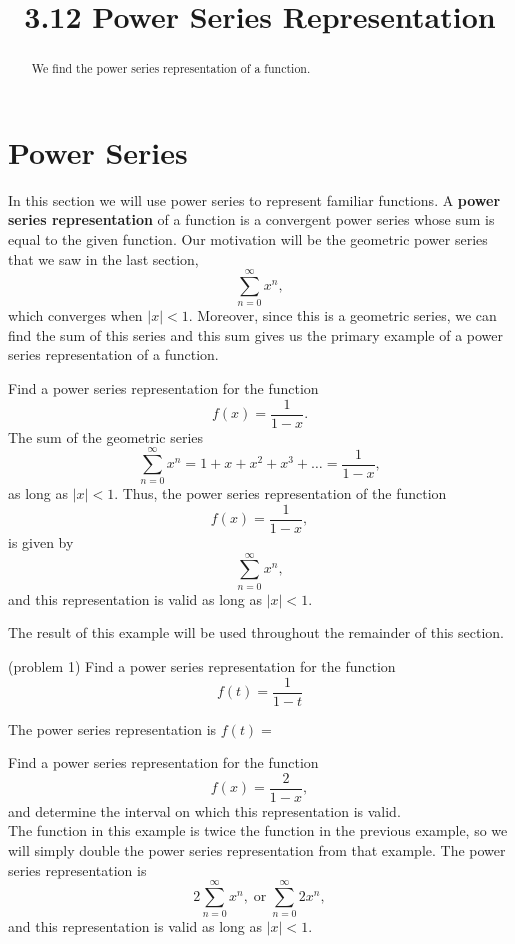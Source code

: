 \documentclass[handout]{ximera}
\title{3.12 Power Series Representation}
\begin{document}
\begin{abstract}
We find the power series representation of a function.
\end{abstract}

\maketitle

\section{Power Series}

In this section we will use power series to represent familiar functions.
A \textbf{power series representation} of a function is a convergent power series whose sum is equal to the given function.
Our motivation will be the geometric power series that we saw in the last section,
\[
\sum_{n=0}^\infty x^n,
\]
which converges when $|x| < 1$. Moreover, since this is a geometric series, we can find the sum of this series
and this sum gives us the primary example of a power series representation of a function.

\begin{example}[example 1]
Find a power series representation for the function 
\[
f(x) = \frac{1}{1-x}.
\]
The sum of the geometric series
\[
\sum_{n=0}^\infty x^n = 1 + x + x^2 + x^3 + \dots =  \frac{1}{1-x},
\]
as long as $|x| < 1$.  Thus, the power series representation of the function 
\[
f(x) = \frac{1}{1-x},
\]
is given by 
\[
\sum_{n=0}^\infty x^n,
\]
and this representation is valid as long as $|x| < 1$.
\end{example}

The result of this example will be used throughout the remainder of this section.


\begin{problem}(problem 1)
Find a power series representation for the function
\[
f(t) = \frac{1}{1-t}
\]

The power series representation is $f(t) = $
\begin{multipleChoice}
\end{multipleChoice}
\end{problem}




\begin{example}[example 2]
Find a power series representation for the function
\[
f(x) = \frac{2}{1-x},
\]
and determine the interval on which this representation is valid.\\
The function in this example is twice the function in the previous example, 
so we will simply double the power series representation from that example.
The power series representation is
\[
2\sum_{n=0}^\infty x^n,  \; \text{or} \; \sum_{n=0}^\infty 2x^n,
\]
and this representation is valid as long as $|x| < 1$.

\end{example}
\end{document}
